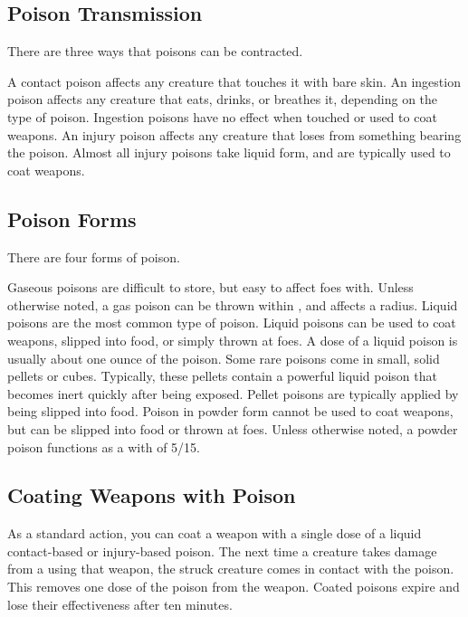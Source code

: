     \subsection{Poison Transmission}\label{Poison Transmission}\label{Transmission}

        There are three ways that poisons can be contracted.

         A contact poison affects any creature that touches it with bare skin.
         An ingestion poison affects any creature that eats, drinks, or breathes it, depending on the type of poison.
        Ingestion poisons have no effect when touched or used to coat weapons.
         An injury poison affects any creature that loses  from something bearing the poison.
        Almost all injury poisons take liquid form, and are typically used to coat weapons.

    \subsection{Poison Forms}\label{Poison Forms}

        There are four forms of poison.

         Gaseous poisons are difficult to store, but easy to affect foes with.
        Unless otherwise noted, a gas poison can be thrown within \shortrange, and affects a \tinyarea radius.
         Liquid poisons are the most common type of poison.
        Liquid poisons can be used to coat weapons, slipped into food, or simply thrown at foes.
        A dose of a liquid poison is usually about one ounce of the poison.
         Some rare poisons come in small, solid pellets or cubes.
        Typically, these pellets contain a powerful liquid poison that becomes inert quickly after being exposed.
        Pellet poisons are typically applied by being slipped into food.
         Poison in powder form cannot be used to coat weapons, but can be slipped into food or thrown at foes.
        Unless otherwise noted, a powder poison functions as a  with  of 5/15.

    \subsection{Coating Weapons with Poison}\label{Coating Weapons with Poison}
        As a standard action, you can coat a weapon with a single dose of a liquid contact-based or injury-based poison.
        The next time a creature takes damage from a  using that weapon, the struck creature comes in contact with the poison.
        This removes one dose of the poison from the weapon.
        Coated poisons expire and lose their effectiveness after ten minutes.

